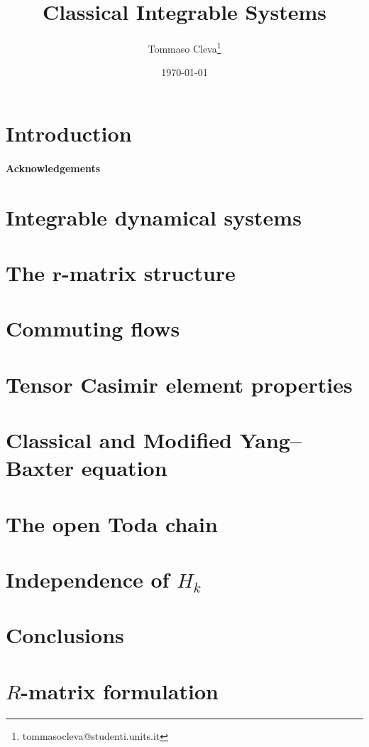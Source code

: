 \documentclass[english,twoside]{article}
\title{Classical Integrable Systems}
\author{Tommaso Cleva\footnote{tommasocleva@studenti.units.it}}
\date{\today}
\theoremstyle{plain}
\theoremstyle{definition}
\theoremstyle{remark}
\numberwithin{equation}{section} %
\begin{document}


\newpage
\begin{abstract}
    
\end{abstract}
\newpage

\tableofcontents
\newpage

\section{Introduction}


\paragraph{Acknowledgements}


\section{Integrable dynamical systems}


\section{The \texorpdfstring{$\boldsymbol{r}$}{r}-matrix structure}\label{sec:rmatrix_formalism}


\section{Commuting flows}\label{sec:Commuting flows}


\section{Tensor Casimir element properties}\label{sec:casimir}


\section{Classical and Modified Yang--Baxter equation}\label{sec:YB}


\section{The open Toda chain}


\section{Independence of \texorpdfstring{${H_k}$}{Hk}}\label{sec:Independence of Hk}


\section{Conclusions}


\newpage
\appendix
\section{\texorpdfstring{$R$}{R}-matrix formulation}\label{app:Rmatrix}


\newpage
\nocite{*}
\printbibliography
\end{document}
